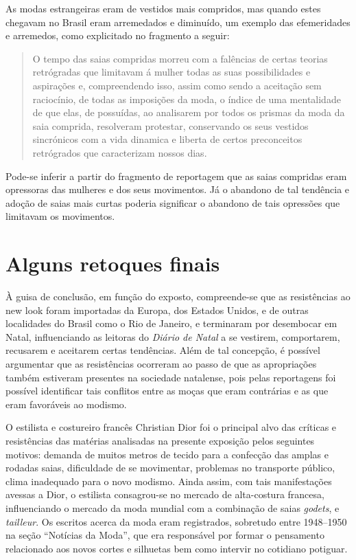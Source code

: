 \begin{refsection}
    As modas estrangeiras eram de vestidos mais compridos, mas quando estes chegavam no Brasil eram arremedados e diminuído, um exemplo das efemeridades e arremedos, como explicitado no fragmento a seguir:

    \begin{quotation}
        O tempo das saias compridas morreu com a falências de certas teorias retrógradas que limitavam á mulher todas as suas possibilidades e aspirações e, compreendendo isso, assim como sendo a aceitação sem raciocínio, de todas as imposições da moda, o índice de uma mentalidade de que elas, de possuídas, ao analisarem por todos os prismas da moda da saia comprida, resolveram protestar, conservando os seus vestidos sincrónicos com a vida dinamica e liberta de certos preconceitos retrógrados que caracterizam nossos dias.
    \end{quotation}

    Pode-se inferir a partir do fragmento de reportagem que as saias compridas eram opressoras das mulheres e dos seus movimentos. Já o abandono de tal tendência e adoção de saias mais curtas poderia significar o abandono de tais opressões que limitavam os movimentos.

    \section{Alguns retoques finais}

    À guisa de conclusão, em função do exposto, compreende-se que as resistências ao new look foram importadas da Europa, dos Estados Unidos, e de outras localidades do Brasil como o Rio de Janeiro, e terminaram por desembocar em Natal, influenciando as leitoras do \textit{Diário de Natal} a se vestirem, comportarem, recusarem e aceitarem certas tendências. Além de tal concepção, é possível argumentar que as resistências ocorreram ao passo de que as apropriações também estiveram presentes na sociedade natalense, pois pelas reportagens foi possível identificar tais conflitos entre as moças que eram contrárias e as que eram favoráveis ao modismo.

    O estilista e costureiro francês Christian Dior foi o principal alvo das críticas e resistências das matérias analisadas na presente exposição pelos seguintes motivos: demanda de muitos metros de tecido para a confecção das amplas e rodadas saias, dificuldade de se movimentar, problemas no transporte público, clima inadequado para o novo modismo. Ainda assim, com tais manifestações avessas a Dior, o estilista consagrou-se no mercado de alta-costura francesa, influenciando o mercado da moda mundial com a combinação de saias \textit{godets}, e \textit{tailleur}. Os escritos acerca da moda eram registrados, sobretudo entre 1948--1950 na seção ``Notícias da Moda'', que era responsável por formar o pensamento relacionado aos novos cortes e silhuetas bem como intervir no cotidiano potiguar.  


\end{refsection}
